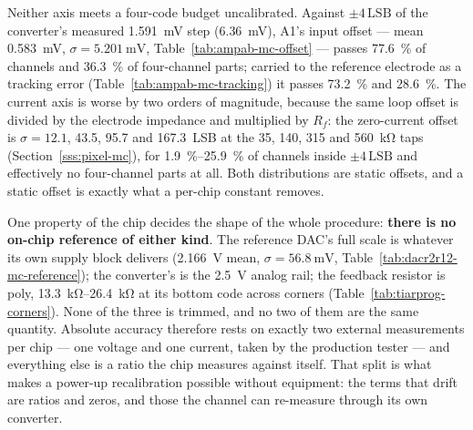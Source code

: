 Neither axis meets a four-code budget uncalibrated. Against
\(\pm4\,\mathrm{LSB}\) of the converter's measured \SI{1.591}{\milli\volt} step
(\SI{6.36}{\milli\volt}), A1's input offset --- mean \SI{0.583}{\milli\volt},
\(\sigma = \SI{5.201}{\milli\volt}\), Table~\ref{tab:ampab-mc-offset} --- passes
\SI{77.6}{\percent} of channels and \SI{36.3}{\percent} of four-channel parts;
carried to the reference electrode as a tracking error
(Table~\ref{tab:ampab-mc-tracking}) it passes \SI{73.2}{\percent} and
\SI{28.6}{\percent}. The current axis is worse by two orders of magnitude,
because the same loop offset is divided by the electrode impedance and
multiplied by \(R_f\): the zero-current offset is \(\sigma = 12.1\), 43.5, 95.7
and \SI{167.3}{LSB} at the 35, 140, 315 and \SI{560}{\kilo\ohm} taps
(Section~\ref{sss:pixel-mc}), for \SIrange{1.9}{25.9}{\percent} of channels
inside \(\pm4\,\mathrm{LSB}\) and effectively no four-channel parts at all.
Both distributions are static offsets, and a static offset is exactly what a
per-chip constant removes.

One property of the chip decides the shape of the whole procedure: \textbf{there
is no on-chip reference of either kind}. The reference DAC's full scale is
whatever its own supply block delivers (\SI{2.166}{\volt} mean, \(\sigma =
\SI{56.8}{\milli\volt}\), Table~\ref{tab:dacr2r12-mc-reference}); the
converter's is the \SI{2.5}{\volt} analog rail; the feedback resistor is poly,
\SIrange{13.3}{26.4}{\kilo\ohm} at its bottom code across corners
(Table~\ref{tab:tiarprog-corners}). None of the three is trimmed, and no two of
them are the same quantity. Absolute accuracy therefore rests on exactly two
external measurements per chip --- one voltage and one current, taken by the
production tester --- and everything else is a ratio the chip measures against
itself. That split is what makes a power-up recalibration possible without
equipment: the terms that drift are ratios and zeros, and those the channel can
re-measure through its own converter.
